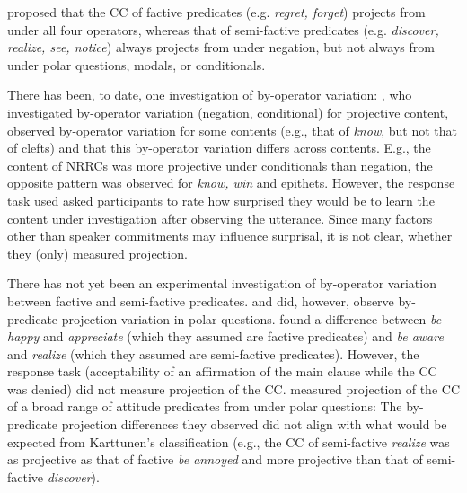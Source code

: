 \documentclass[12pt, a4paper]{article}
\begin{document}
	\vspace{-.4\baselineskip}
	\citet{karttunen_observations_1971} proposed that the CC of factive predicates (e.g. \emph{regret, forget}) projects from under all four operators, whereas that of semi-factive predicates (e.g. \emph{discover, realize, see, notice}) always projects from under negation, but not always from under polar questions, modals, or conditionals. 
	
	There has been, to date, one investigation of by-operator variation: \citet{smith_relationship_2014}, who investigated by-operator variation (negation, conditional) for projective content, observed by-operator variation for some contents (e.g., that of \emph{know}, but not that of clefts) and that this by-operator variation differs across contents. E.g., the content of NRRCs was more projective under conditionals than negation, the opposite pattern was observed for \emph{know, win} and epithets. However, the response task used asked participants to rate how surprised they would be to learn the content under investigation after observing the utterance. Since many factors other than speaker commitments may influence surprisal, it is not clear, whether they (only) measured projection.

	There has not yet been an experimental investigation of by-operator variation between factive and semi-factive predicates. \citet{djarv_cognitive_2018} and \citet{tonhauser_how_2018} did, however, observe by-predicate projection variation in polar questions. \citet{djarv_cognitive_2018} found a difference between \emph{be happy} and \emph{appreciate} (which they assumed are factive predicates) and \emph{be aware} and \emph{realize} (which they assumed are semi-factive predicates). However, the response task (acceptability of an affirmation of the main clause while the CC was denied) did not measure projection of the CC. \citealt{tonhauser_how_2018} measured projection of the CC of a broad range of attitude predicates from under polar questions: The by-predicate projection differences they observed did not align with what would be expected from Karttunen's classification (e.g., the CC of semi-factive \emph{realize} was as projective as that of factive \emph{be annoyed} and more projective than that of semi-factive \emph{discover}).
\end{document}
